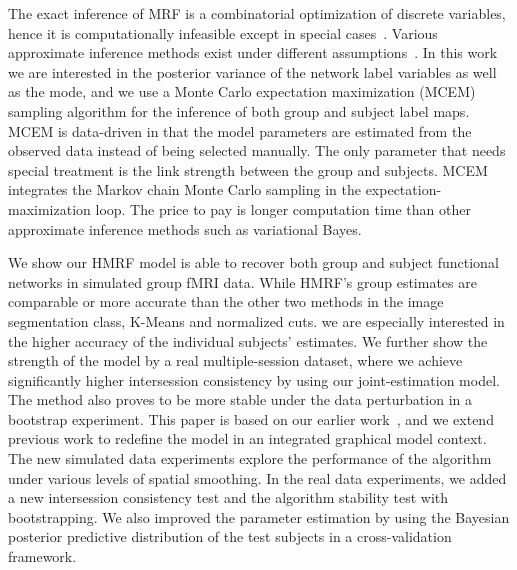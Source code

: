 \documentclass[review,authoryear]{elsarticle}
\begin{document}
The exact inference of MRF is a combinatorial optimization of discrete
variables, hence it is computationally infeasible except in special
cases~\citep{greig1989exact,ng2012modeling}. Various approximate inference
methods exist under different assumptions~\citep{murphy1999loopy,
  boykov2001fast, jordan1998introduction}. In this work we are interested in the
posterior variance of the network label variables as well as the mode, and we
use a Monte Carlo expectation maximization (MCEM) sampling algorithm for the
inference of both group and subject label maps. MCEM is data-driven in that the
model parameters are estimated from the observed data instead of being selected
manually. The only parameter that needs special treatment is the link strength
between the group and subjects. MCEM integrates the Markov chain Monte Carlo
sampling in the expectation-maximization loop. The price to pay is longer
computation time than other approximate inference methods such as variational
Bayes.

We show our HMRF model is able to recover both group and subject functional
networks in simulated group fMRI data.  While HMRF's group estimates are
comparable or more accurate than the other two methods in the image segmentation
class, K-Means and normalized cuts. we are especially interested in the higher
accuracy of the individual subjects' estimates. We further show the strength of
the model by a real multiple-session dataset, where we achieve significantly
higher intersession consistency by using our joint-estimation model. The method
also proves to be more stable under the data perturbation in a bootstrap
experiment. This paper is based on our earlier work~\cite{liu2012group}, and we
extend previous work to redefine the model in an integrated graphical model
context. The new simulated data experiments explore the performance of the
algorithm under various levels of spatial smoothing. In the real data
experiments, we added a new intersession consistency test and the algorithm
stability test with bootstrapping. We also improved the parameter estimation by
using the Bayesian posterior predictive distribution of the test subjects in a
cross-validation framework.
\end{document}

